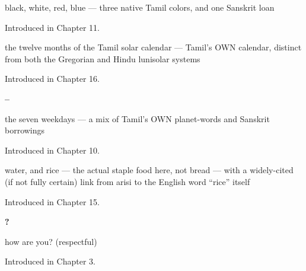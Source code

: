 \noindent\begin{minipage}[t]{\linewidth}
\raggedright
\textbf{   }\par
\small black, white, red, blue — three native Tamil colors, and one Sanskrit loan\par
\footnotesize Introduced in Chapter 11.
\end{minipage}\par\medskip

\noindent\begin{minipage}[t]{\linewidth}
\raggedright
\textbf{           }\par
\small the twelve months of the Tamil solar calendar — Tamil's OWN calendar, distinct from both the Gregorian and Hindu lunisolar systems\par
\footnotesize Introduced in Chapter 16.
\end{minipage}\par\medskip

\noindent\begin{minipage}[t]{\linewidth}
\raggedright
\textbf{–}\par
\small the seven weekdays — a mix of Tamil's OWN planet-words and Sanskrit borrowings\par
\footnotesize Introduced in Chapter 10.
\end{minipage}\par\medskip

\noindent\begin{minipage}[t]{\linewidth}
\raggedright
\textbf{  }\par
\small water, and rice — the actual staple food here, not bread — with a widely-cited (if not fully certain) link from arisi to the English word \textquotedblleft{}rice\textquotedblright{} itself\par
\footnotesize Introduced in Chapter 15.
\end{minipage}\par\medskip

\noindent\begin{minipage}[t]{\linewidth}
\raggedright
\textbf{  ?}\par
\small how are you? (respectful)\par
\footnotesize Introduced in Chapter 3.
\end{minipage}\par\medskip

